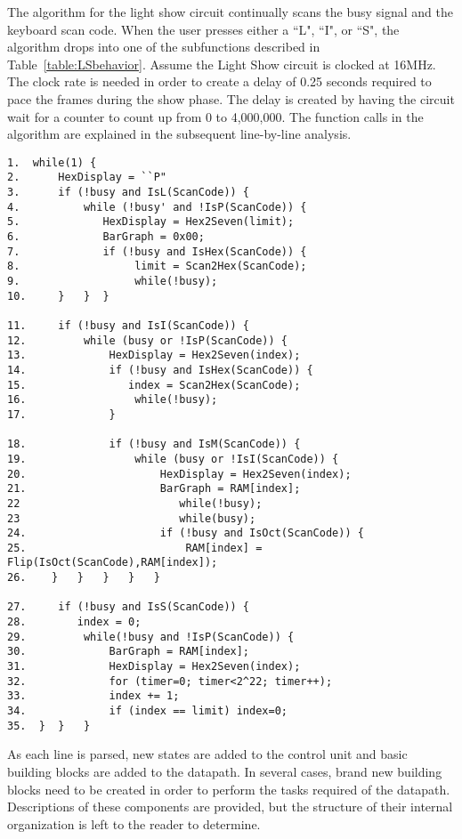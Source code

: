 The algorithm for the light show circuit continually scans the busy signal
and the keyboard scan code.  When the user presses either a ``L",
``I", or ``S",
the algorithm drops into one of the subfunctions described in
Table~\ref{table:LSbehavior}.  Assume the Light Show circuit is
clocked at 16MHz.  The clock rate is needed in order to create a delay of
0.25 seconds required to pace the frames during the show phase.  The delay is
created by having the circuit wait for a counter to count up from 0 to
4,000,000.  The function calls in the algorithm are explained in the
subsequent line-by-line analysis.

\pagebreak
\begin{verbatim}
1.  while(1) {
2.      HexDisplay = ``P"
3.      if (!busy and IsL(ScanCode)) {
4.          while (!busy' and !IsP(ScanCode)) {
5.             HexDisplay = Hex2Seven(limit);
6.             BarGraph = 0x00;
7.             if (!busy and IsHex(ScanCode)) {
8.                  limit = Scan2Hex(ScanCode);
9.                  while(!busy);
10.     }   }  }

11.     if (!busy and IsI(ScanCode)) {
12.         while (busy or !IsP(ScanCode)) {
13.             HexDisplay = Hex2Seven(index);
14.             if (!busy and IsHex(ScanCode)) {
15.                index = Scan2Hex(ScanCode);
16.                 while(!busy);
17.             }

18.             if (!busy and IsM(ScanCode)) {
19.                 while (busy or !IsI(ScanCode)) {
20.                     HexDisplay = Hex2Seven(index);
21.                     BarGraph = RAM[index];
22                         while(!busy);
23                         while(busy);
24.                     if (!busy and IsOct(ScanCode)) {
25.                         RAM[index] = Flip(IsOct(ScanCode),RAM[index]);
26.    }   }   }   }   }

27.     if (!busy and IsS(ScanCode)) {
28.        index = 0;
29.         while(!busy and !IsP(ScanCode)) {
30.             BarGraph = RAM[index];
31.             HexDisplay = Hex2Seven(index);
32.             for (timer=0; timer<2^22; timer++);
33.             index += 1;
34.             if (index == limit) index=0;
35.  }  }   }
\end{verbatim}

As each line is parsed, new states are added to the control unit and basic building
blocks are added to the datapath.  In several cases, brand new building blocks need
to be created in order to perform the tasks required of the datapath.  Descriptions of
these components are provided, but the structure of their internal organization
is left to the reader to determine.

